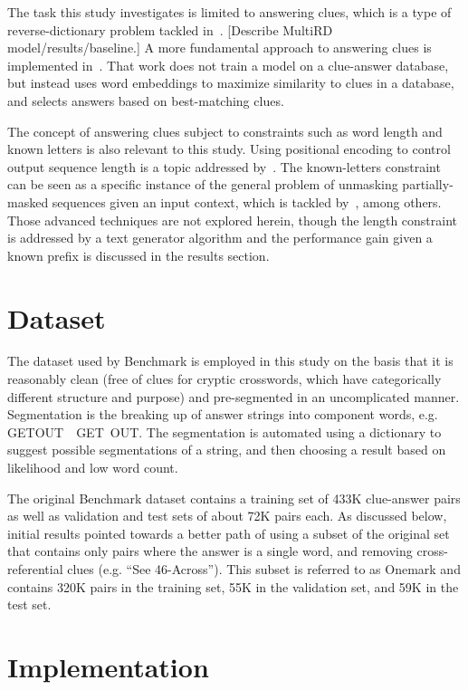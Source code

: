 \documentclass[letterpaper]{article} %
\begin{document}
\begin{NoHyper}
The task this study investigates is limited to answering clues, which is a type of reverse-dictionary problem tackled in~\citealp{zhang2019multichannel}. [Describe MultiRD model/results/baseline.] A more fundamental approach to answering clues is implemented in~\citealp{baselinesolver}.
That work does not train a model on a clue-answer database, but instead uses word embeddings to maximize similarity to clues in a database, and selects answers based on best-matching clues.

The concept of answering clues subject to constraints such as word length and known letters is also relevant to this study. Using positional encoding to control output sequence length is a topic addressed by~\citealp{takase2019positional}. The known-letters constraint can be seen as a specific instance of the general problem of unmasking partially-masked sequences given an input context, which is tackled by~\citealp{raffel2023exploring}, among others. Those advanced techniques are not explored herein, though the length constraint is addressed by a text generator algorithm and the performance gain given a known prefix is discussed in the results section.


\section{Dataset}
\label{sec:dataset}

The dataset used by Benchmark is employed in this study on the basis that it is reasonably clean (free of clues for cryptic crosswords, which have categorically different structure and purpose) and pre-segmented in an uncomplicated manner. Segmentation is the breaking up of answer strings into component words, e.g. GETOUT~\textrightarrow~GET~OUT. The segmentation is automated using a dictionary to suggest possible segmentations of a string, and then choosing a result based on likelihood and low word count.

The original Benchmark dataset contains a training set of 433K clue-answer pairs as well as validation and test sets of about 72K pairs each. As discussed below, initial results pointed towards a better path of using a subset of the original set that contains only pairs where the answer is a single word, and removing cross-referential clues (e.g. ``See 46-Across''). This subset is referred to as Onemark and contains 320K pairs in the training set, 55K in the  validation set, and 59K in the test set.

\section{Implementation}
\label{sec:impl}


\end{NoHyper}
\end{document}
